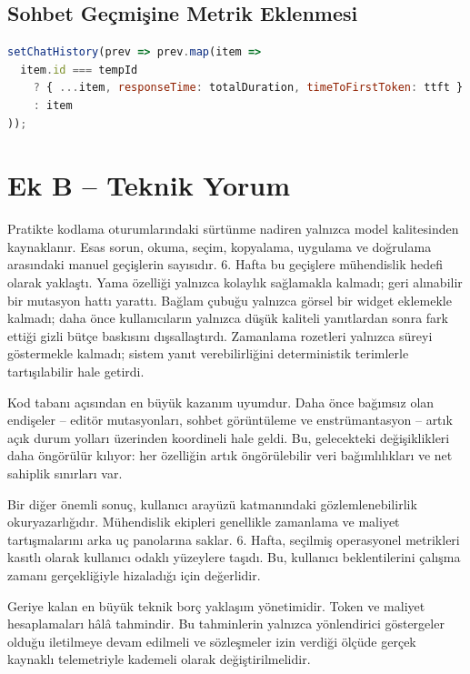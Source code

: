 \documentclass[12pt,a4paper]{article}
\begin{document}
\subsection{Sohbet Geçmişine Metrik Eklenmesi}
\begin{lstlisting}[language=JavaScript]
setChatHistory(prev => prev.map(item =>
  item.id === tempId
    ? { ...item, responseTime: totalDuration, timeToFirstToken: ttft }
    : item
));
\end{lstlisting}

\section{Ek B -- Teknik Yorum}

Pratikte kodlama oturumlarındaki sürtünme nadiren yalnızca model kalitesinden kaynaklanır. Esas sorun, okuma, seçim, kopyalama, uygulama ve doğrulama arasındaki manuel geçişlerin sayısıdır. 6. Hafta bu geçişlere mühendislik hedefi olarak yaklaştı. Yama özelliği yalnızca kolaylık sağlamakla kalmadı; geri alınabilir bir mutasyon hattı yarattı. Bağlam çubuğu yalnızca görsel bir widget eklemekle kalmadı; daha önce kullanıcıların yalnızca düşük kaliteli yanıtlardan sonra fark ettiği gizli bütçe baskısını dışsallaştırdı. Zamanlama rozetleri yalnızca süreyi göstermekle kalmadı; sistem yanıt verebilirliğini deterministik terimlerle tartışılabilir hale getirdi.

Kod tabanı açısından en büyük kazanım uyumdur. Daha önce bağımsız olan endişeler -- editör mutasyonları, sohbet görüntüleme ve enstrümantasyon -- artık açık durum yolları üzerinden koordineli hale geldi. Bu, gelecekteki değişiklikleri daha öngörülür kılıyor: her özelliğin artık öngörülebilir veri bağımlılıkları ve net sahiplik sınırları var.

Bir diğer önemli sonuç, kullanıcı arayüzü katmanındaki gözlemlenebilirlik okuryazarlığıdır. Mühendislik ekipleri genellikle zamanlama ve maliyet tartışmalarını arka uç panolarına saklar. 6. Hafta, seçilmiş operasyonel metrikleri kasıtlı olarak kullanıcı odaklı yüzeylere taşıdı. Bu, kullanıcı beklentilerini çalışma zamanı gerçekliğiyle hizaladığı için değerlidir.

Geriye kalan en büyük teknik borç yaklaşım yönetimidir. Token ve maliyet hesaplamaları hâlâ tahmindir. Bu tahminlerin yalnızca yönlendirici göstergeler olduğu iletilmeye devam edilmeli ve sözleşmeler izin verdiği ölçüde gerçek kaynaklı telemetriyle kademeli olarak değiştirilmelidir.
\end{document}
